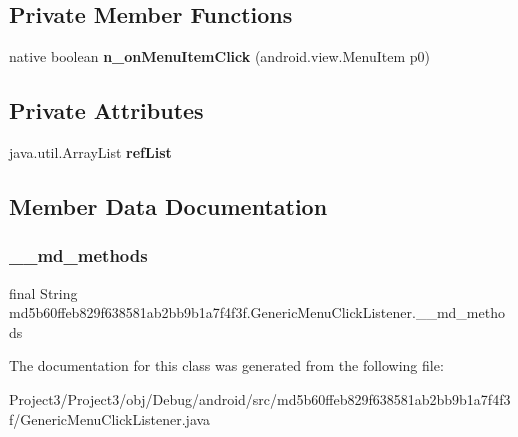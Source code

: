 \subsection*{Private Member Functions}
\begin{DoxyCompactItemize}
\item 
\mbox{\label{classmd5b60ffeb829f638581ab2bb9b1a7f4f3f_1_1GenericMenuClickListener_ad79cc5f2c942327d4e5cf787a3c966ba}} 
native boolean {\bfseries n\+\_\+on\+Menu\+Item\+Click} (android.\+view.\+Menu\+Item p0)
\end{DoxyCompactItemize}
\subsection*{Private Attributes}
\begin{DoxyCompactItemize}
\item 
\mbox{\label{classmd5b60ffeb829f638581ab2bb9b1a7f4f3f_1_1GenericMenuClickListener_a909ed47c921c4011184b52ac08dcc46e}} 
java.\+util.\+Array\+List {\bfseries ref\+List}
\end{DoxyCompactItemize}


\subsection{Member Data Documentation}
\mbox{\label{classmd5b60ffeb829f638581ab2bb9b1a7f4f3f_1_1GenericMenuClickListener_a6c9c1226d60f05dc9be14f20174fdebb}} 
\subsubsection{\texorpdfstring{\+\_\+\+\_\+md\+\_\+methods}{\_\_md\_methods}}
{\footnotesize\ttfamily final String md5b60ffeb829f638581ab2bb9b1a7f4f3f.\+Generic\+Menu\+Click\+Listener.\+\_\+\+\_\+md\+\_\+methods\hspace{0.3cm}{\ttfamily [static]}}



The documentation for this class was generated from the following file\+:\begin{DoxyCompactItemize}
\item 
Project3/\+Project3/obj/\+Debug/android/src/md5b60ffeb829f638581ab2bb9b1a7f4f3f/Generic\+Menu\+Click\+Listener.\+java\end{DoxyCompactItemize}

